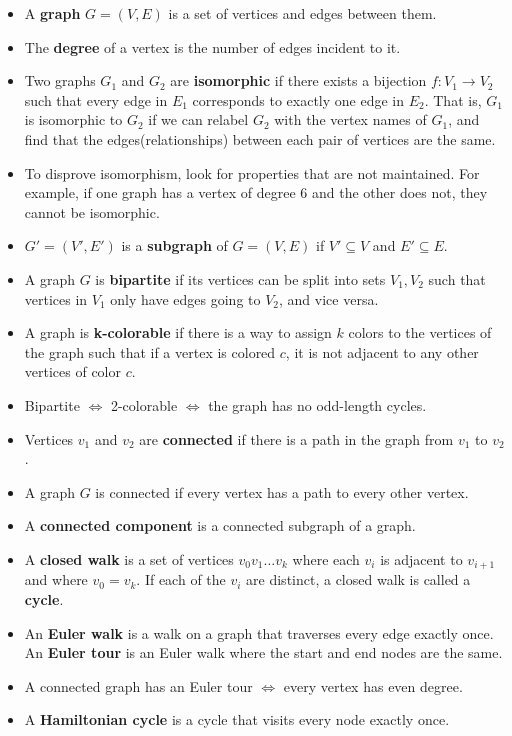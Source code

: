 \documentclass[11pt]{article}
\begin{document}
\begin{itemize}
	\item A \textbf{graph} $G = (V, E)$ is a set of vertices and edges between them.
	\item The \textbf{degree} of a vertex is the number of edges incident to it.
	\item Two graphs $G_1$ and $G_2$ are \textbf{isomorphic} if there exists a bijection
	$f: V_1 \rightarrow V_2$ such that every edge in $E_1$ corresponds to exactly one
	edge in $E_2$.  That is, $G_1$ is isomorphic to $G_2$ if we can relabel $G_2$ with
	the vertex names of $G_1$, and find that the edges(relationships) between each pair
	of vertices are the same. 
	\item To disprove isomorphism, look for properties that are not maintained.  For example, if one graph has a vertex of degree $6$ and the other does not, they cannot
	be isomorphic.
	\item $G' = (V', E')$ is a \textbf{subgraph} of $G = (V, E)$ if $V' \subseteq V$ and
	$E' \subseteq E$. 
	
	\item A graph $G$ is \textbf{bipartite} if its vertices can be split into sets $V_1, V_2$
	such that vertices in $V_1$ only have edges going to $V_2$, and vice versa.
	\item A graph is \textbf{k-colorable} if there is a way to assign $k$ colors to the vertices of the graph such that if a vertex is colored $c$, it is not adjacent to any other vertices of color $c$.
	\item Bipartite $\Leftrightarrow$ 2-colorable $\Leftrightarrow$ the graph has no odd-length cycles.
	\item Vertices $v_1$ and $v_2$ are \textbf{connected} if there is a path in the graph
	from $v_1$ to $v_2$.
	\item A graph $G$ is connected if every vertex has a path to every other vertex.
	\item A \textbf{connected component} is a connected subgraph of a graph.
	\item A \textbf{closed walk} is a set of vertices $v_0v_1\ldots v_k$ where each
	$v_i$ is adjacent to $v_{i+1}$ and where $v_0 = v_k$.  If each of the $v_i$ are
	distinct, a closed walk is called a \textbf{cycle}.
	\item An \textbf{Euler walk} is a walk on a graph that traverses every edge exactly once.  An \textbf{Euler tour} is an Euler walk where the start and end nodes are the same.
	\item A connected graph has an Euler tour $\Leftrightarrow$ every vertex has even
	degree.
	\item A \textbf{Hamiltonian cycle} is a cycle that visits every node exactly once.
\end{itemize}
\end{document}
